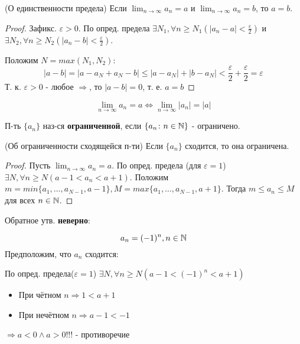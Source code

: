 \begin{theorem}(О единственности предела)
    Если $\lim_{n\to\infty} a_n = a$ и $\lim_{n\to\infty}a_n = b$, то $a = b$.
\end{theorem}
\begin{proof}
Зафикс. $\varepsilon > 0$. По опред. предела $\exists N_1, \forall n \geq N_1 (|a_n - a| < \frac{\varepsilon}{2})$ и $\exists N_2, \forall n \geq N_2(|a_n - b| < \frac{\varepsilon}{2})$.

Положим $N = max(N_1, N_2)$:
\[
|a - b| = |a - a_N + a_N - b| \leq |a - a_N| + |b - a_N| < \frac{\varepsilon}{2} + \frac{\varepsilon}{2} = \varepsilon
\] 
Т. к. $\varepsilon > 0$ - любое $\Rightarrow$, то $|a - b| = 0$, т. е. $a = b$
\end{proof}
\begin{task}
\[
\lim_{n\to\infty}a_n = a \iff \lim_{n\to\infty}|a_n| = |a|
\] 
\end{task}
\begin{definition}
П-ть $\{a_n\}$ наз-ся \textbf{ограниченной}, если $\{a_n \colon  n \in \mathbb{N}\}$ - ограничено.
\end{definition}
\begin{theorem}(Об ограниченности сходящейся п-ти)
Если $\{a_n\}$ сходится, то она ограничена.
\end{theorem}
\begin{proof}
Пусть $\lim_{n\to\infty}a_n = a$. По опред. предела (для $\varepsilon = 1$) $\exists N, \forall n \geq N (a - 1 < a_n < a + 1)$. Положим $m = min\{a_1, \ldots, a_{N - 1}, a - 1\}, M = max \{a_1, \ldots , a_{N - 1}, a + 1\}$. Тогда $m \leq a_n \leq M$ для всех $n \in \mathbb{N}$.
\end{proof}
\begin{note}
Обратное утв. \textbf{неверно}:
\begin{example}
\[
a_n = (-1)^{n}, n \in \mathbb{N}
\] 
Предположим, что $a_n$ сходится:

По опред. предела($\varepsilon = 1$) $\exists N, \forall n \geq N (a - 1 < (-1)^{n} < a + 1) $

\begin{itemize}
    \item При чётном $n \Rightarrow 1 < a + 1$
    \item При нечётном $n \Rightarrow a - 1 < -1$
\end{itemize}
$\Rightarrow a < 0 \land a > 0!!!$ - противоречие
\end{example}
\end{note}

